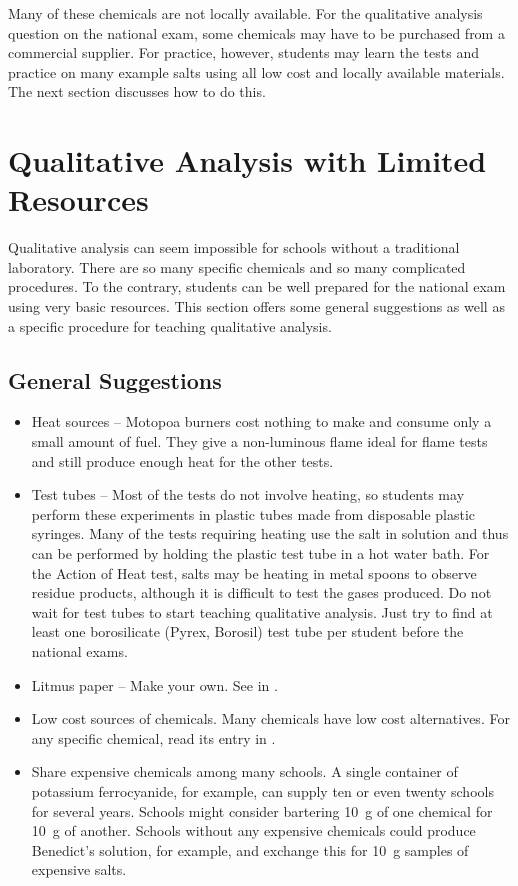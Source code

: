 Many of these chemicals are not locally available. For the qualitative analysis question on the national exam, some chemicals may have to be purchased from a commercial supplier. For practice, however, students may learn the tests and practice on many example salts using all low cost and locally available materials. The next section discusses how to do this.

\section{Qualitative Analysis with Limited Resources}

Qualitative analysis can seem impossible for schools 
without a traditional laboratory. 
There are so many specific chemicals 
and so many complicated procedures. 
To the contrary, 
students can be well prepared for the national exam 
using very basic resources. 
This section offers some general suggestions as well as 
a specific procedure for teaching qualitative analysis.

\subsection{General Suggestions}
\begin{itemize}
\item{Heat sources – Motopoa burners 
cost nothing to make and consume only a small amount of fuel. 
They give a non-luminous flame ideal for flame tests 
and still produce enough heat for the other tests.}
\item{Test tubes – Most of the tests do not involve heating, 
so students may perform these experiments in plastic tubes 
made from disposable plastic syringes. 
Many of the tests requiring heating use the salt in solution 
and thus can be performed 
by holding the plastic test tube in a hot water bath.
For the Action of Heat test, 
salts may be heating in metal spoons to observe residue products, 
although it is difficult to test the gases produced. 
Do not wait for test tubes to start teaching qualitative analysis. 
Just try to find at least one borosilicate (Pyrex, 
Borosil) test tube per student before the national exams.}
\item{Litmus paper – Make your own. 
See  in .}
\item{Low cost sources of chemicals. 
Many chemicals have low cost alternatives. 
For any specific chemical, 
read its entry in .}
\item{Share expensive chemicals among many schools. 
A single container of potassium ferrocyanide, 
for example, 
can supply ten or even twenty schools for several years. 
Schools might consider bartering 10~g of one chemical for 10~g of another. 
Schools without any expensive chemicals could produce Benedict's solution, for example, and exchange this for 10~g samples of expensive salts.}
\end{itemize} 
 

